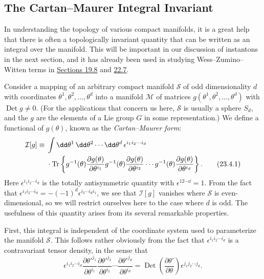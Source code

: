 \subsection{The Cartan--Maurer Integral Invariant}
\label{sec:23.4}

In understanding the topology of various compact manifolds, it is a great
help that there is often a topologically invariant quantity that can be
written as an integral over the manifold. This will be important in our
discussion of instantons in the next section, and it has already been used
in studying Wess--Zumino--Witten terms in
\hyperref[sec:19.8]{Sections 19.8} and \hyperref[sec:22.7]{22.7}.

Consider a mapping of an arbitrary compact manifold $\mathcal S$ of odd
dimensionality $d$ with coordinates
$\theta^1,\theta^2,\ldots,\theta^d$ into a manifold $\mathcal M$ of
matrices $g(\theta^1,\theta^2,\ldots,\theta^d)$ with
$\operatorname{Det}g\ne0$. (For the applications that concern us here,
$\mathcal S$ is usually a sphere $S_d$, and the $g$ are the elements of a
Lie group $G$ in some representation.) We define a functional of
$g(\theta)$, known as the \emph{Cartan--Maurer form}:
\begin{align}
\mathcal I[g]\equiv{}&
\int \dd\theta^1\,\dd\theta^2\cdots \dd\theta^d\,
\epsilon^{i_1i_2\cdots i_d}
\notag\\
&{}\cdot\operatorname{Tr}\left\{
g^{-1}(\theta)\frac{\partial g(\theta)}{\partial\theta^{i_1}}
g^{-1}(\theta)\frac{\partial g(\theta)}{\partial\theta^{i_2}}
\cdots
g^{-1}(\theta)\frac{\partial g(\theta)}{\partial\theta^{i_d}}
\right\}.
\tag{23.4.1}\label{eq:23.4.1}
\end{align}
Here $\epsilon^{i_1i_2\cdots i_d}$ is the totally antisymmetric quantity
with $\epsilon^{12\cdots \dd}=1$. From the fact that
$\epsilon^{i_1i_2\cdots i_d}=-(-1)^d
\epsilon^{i_2\cdots i_di_1}$, we see that $\mathcal I[g]$ vanishes where
$\mathcal S$ is even-dimensional, so we will restrict ourselves here to
the case where $d$ is odd. The usefulness of this quantity arises from
its several remarkable properties.

First, this integral is independent of the coordinate system used to
parameterize the manifold $\mathcal S$. This follows rather obviously
from the fact that $\epsilon^{i_1i_2\cdots i_d}$ is a contravariant tensor
density, in the sense that
\[
\epsilon^{i_1i_2\cdots i_d}
\frac{\partial\theta'^{j_1}}{\partial\theta^{i_1}}
\frac{\partial\theta'^{j_2}}{\partial\theta^{i_2}}\cdots
\frac{\partial\theta'^{j_d}}{\partial\theta^{i_d}}
=\operatorname{Det}\left(\frac{\partial\theta'}{\partial\theta}\right)
\epsilon^{j_1j_2\cdots j_d}.
\]

